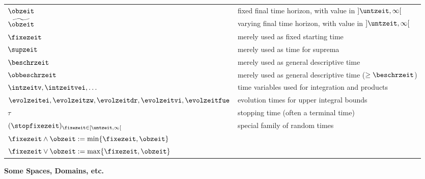 \begin{longtable}{ll}

$\obzeit$ &   fixed final time horizon, with value in $]\untzeit,\infty[$
\\
$\widetilde{\obzeit}$ &   varying final time horizon, with value in $]\untzeit,\infty[$ 
\\
$\fixezeit$ & merely used as fixed starting time 
\\
$\supzeit$ &  merely used as time for suprema
\\
$\beschrzeit$ &  merely used as general descriptive
 time
\\
$\obbeschrzeit$ &  merely used as general descriptive time ($\geq \beschrzeit$)
\\
$\intzeitv, \intzeitvei, \ldots$ &  time variables used for integration and products 
\\
$\evolzeitei,\evolzeitzw,\evolzeitdr,\evolzeitvi,\evolzeitfue$ & evolution times for upper integral bounds 
\\
$\tau$ &  stopping time (often a terminal time) 
\\
$(\stopfixezeit)_{\fixezeit \in [\untzeit,\infty[}$ &  special family of random times
\\
$\fixezeit \wedge \obzeit := \min\{ \fixezeit, \obzeit \}$
\\
$\fixezeit \vee \obzeit := \max\{ \fixezeit, \obzeit \}$
\\
\end{longtable}


{\large \bf Some Spaces, Domains, etc.}



